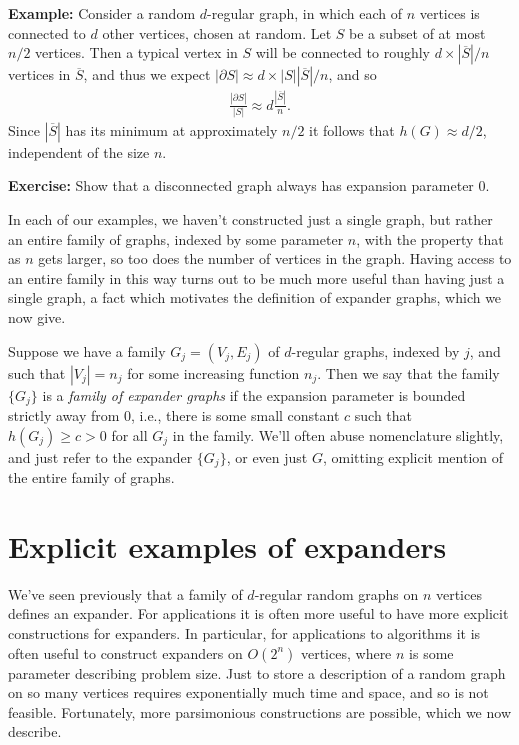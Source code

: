\documentclass[12pt]{article}
\begin{document}
\textbf{Example:} Consider a random $d$-regular graph, in which each
of $n$ vertices is connected to $d$ other vertices, chosen at random.
Let $S$ be a subset of at most $n/2$ vertices.  Then a typical vertex
in $S$ will be connected to roughly $d \times |\overline S|/n$
vertices in $\overline S$, and thus we expect $|\partial S| \approx d
\times |S| |\overline S|/n$, and so
\begin{eqnarray}
  \frac{|\partial S|}{|S|} \approx d \frac{|\overline S|}{n}.
\end{eqnarray}
Since $|\overline S|$ has its minimum at approximately $n/2$ it
follows that $h(G) \approx d/ 2$, independent of the size $n$.

\textbf{Exercise:} Show that a disconnected graph always has expansion
parameter $0$.

In each of our examples, we haven't constructed just a single graph,
but rather an entire family of graphs, indexed by some parameter $n$,
with the property that as $n$ gets larger, so too does the number of
vertices in the graph.  Having access to an entire family in this way
turns out to be much more useful than having just a single graph, a
fact which motivates the definition of expander graphs, which we now
give.

Suppose we have a family $G_j = (V_j,E_j)$ of $d$-regular graphs,
indexed by $j$, and such that $|V_j| = n_j$ for some increasing
function $n_j$.  Then we say that the family $\{ G_j \}$ is a
\emph{family of expander graphs} if the expansion parameter is bounded
strictly away from $0$, i.e., there is some small constant $c$ such
that $h(G_j) \geq c > 0$ for all $G_j$ in the family.  We'll often
abuse nomenclature slightly, and just refer to the expander $\{ G_j
\}$, or even just $G$, omitting explicit mention of the entire family
of graphs.

\section{Explicit examples of expanders}

We've seen previously that a family of $d$-regular random graphs on
$n$ vertices defines an expander.  For applications it is often more
useful to have more explicit constructions for expanders.  In
particular, for applications to algorithms it is often useful to
construct expanders on $O(2^n)$ vertices, where $n$ is some parameter
describing problem size.  Just to store a description of a random
graph on so many vertices requires exponentially much time and space,
and so is not feasible.  Fortunately, more parsimonious constructions
are possible, which we now describe.
\end{document}
